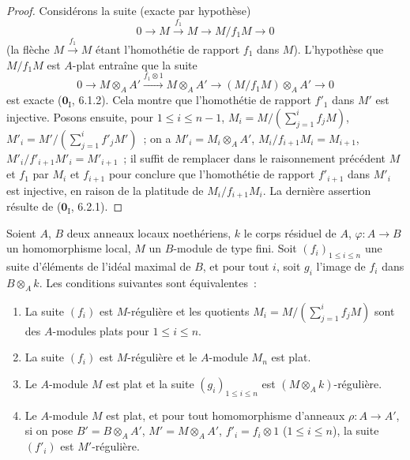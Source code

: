 \begin{proof}
Considérons la suite (exacte par hypothèse)
\[
  0\longrightarrow M\xrightarrow{f_1}M\longrightarrow M/f_1M
  \longrightarrow0
\]
(la flèche $M\xrightarrow{f_1}M$ étant l'homothétie de rapport $f_1$ dans
$M$). L'hypothèse que $M/f_1M$ est $A$-plat entraîne que la suite
\[
  0\longrightarrow M\otimes_A A'
  \xrightarrow{f_1\otimes1}M\otimes_A A'
  \longrightarrow(M/f_1M)\otimes_A A'\longrightarrow0
\]
est exacte ($\mathbf{0}_{\mathrm I}$, 6.1.2). Cela montre que l'homothétie de rapport
$f'_1$ dans $M'$ est injective.
Posons ensuite, pour $1\leq i\leq n-1$,
$M_i=M/(\sum_{j=1}^i f_jM)$, $M'_i=M'/(\sum_{j=1}^i f'_jM')$~;
on a $M'_i=M_i\otimes_A A'$, $M_i/f_{i+1}M_i=M_{i+1}$,
$M'_i/f'_{i+1}M'_i=M'_{i+1}$~; il suffit de remplacer dans le raisonnement
précédent $M$ et $f_1$ par $M_i$ et $f_{i+1}$ pour conclure que l'homothétie
de rapport $f'_{i+1}$ dans $M'_i$ est injective, en raison de la platitude de
$M_i/f_{i+1}M_i$. La dernière assertion résulte de ($\mathbf{0}_{\mathrm I}$, 6.2.1).
\end{proof}

\begin{proposition}[15.1.16]
\label{0.15.1.16-fr}
Soient $A$, $B$ deux anneaux locaux noethériens, $k$ le corps résiduel de
$A$, $\varphi:A\to B$ un homomorphisme local, $M$ un $B$-module de type fini.
Soit $(f_i)_{1\leq i\leq n}$ une suite d'éléments de l'idéal maximal de $B$,
et pour tout $i$, soit $g_i$ l'image de $f_i$ dans $B\otimes_A k$. Les
conditions suivantes sont équivalentes~:
\begin{enumerate}
  \item[\textup{a)}] La suite $(f_i)$ est $M$-régulière et les quotients
  $M_i=M/(\sum_{j=1}^i f_jM)$
  sont des $A$-modules plats pour $1\leq i\leq n$.
  \item[\textup{b)}] La suite $(f_i)$ est $M$-régulière et le $A$-module $M_n$ est
  plat.
  \item[\textup{c)}] Le $A$-module $M$ est plat et la suite
  $(g_i)_{1\leq i\leq n}$ est $(M\otimes_A k)$-régulière.
  \item[\textup{d)}] Le $A$-module $M$ est plat, et pour tout homomorphisme
  d'anneaux $\rho:A\to A'$, si on pose $B'=B\otimes_A A'$,
  $M'=M\otimes_A A'$, $f'_i=f_i\otimes1$ \textup{($1\leq i\leq n$)}, la suite
  $(f'_i)$ est $M'$-régulière.
\end{enumerate}
\end{proposition}

